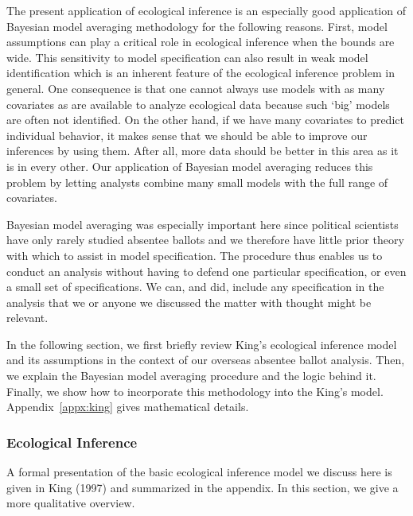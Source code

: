 \documentclass[11pt,titlepage]{article}
\begin{document}
The present application of ecological inference is an especially good
application of Bayesian model averaging methodology for the following
reasons.  First, model assumptions can play a critical role in
ecological inference when the bounds are wide.  This sensitivity to
model specification can also result in weak model identification which
is an inherent feature of the ecological inference problem in general.
One consequence is that one cannot always use models with as many
covariates as are available to analyze ecological data because such
`big' models are often not identified.  On the other hand, if we have
many covariates to predict individual behavior, it makes sense that we
should be able to improve our inferences by using them.  After all,
more data should be better in this area as it is in every other.  Our
application of Bayesian model averaging reduces this problem by
letting analysts combine many small models with the full range of
covariates.

Bayesian model averaging was especially important here since political
scientists have only rarely studied absentee ballots and we therefore
have little prior theory with which to assist in model specification.
The procedure thus enables us to conduct an analysis without having to
defend one particular specification, or even a small set of
specifications.  We can, and did, include any specification in the
analysis that we or anyone we discussed the matter with thought might
be relevant.

In the following section, we first briefly review King's ecological
inference model \citet{king:97} and its assumptions in the context of
our overseas absentee ballot analysis.  Then, we explain the Bayesian
model averaging procedure and the logic behind it.  Finally, we show
how to incorporate this methodology into the King's model.
Appendix~\ref{appx:king} gives mathematical details.

\subsubsection{Ecological Inference}

A formal presentation of the basic ecological inference model we
discuss here is given in King (1997) and summarized in the appendix.
In this section, we give a more qualitative overview.
\end{document}
